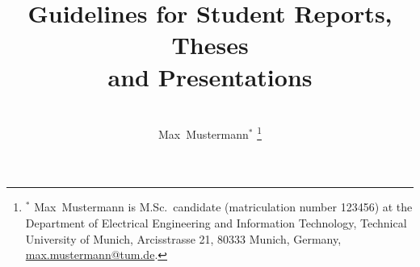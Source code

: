 \documentclass[journal]{IEEEtran}
\begin{document}
\title{Guidelines for Student Reports, Theses\\ and Presentations}

\author{%
\\
Max~Mustermann$^*$%
\thanks{$^*$ Max~Mustermann is M.Sc.\ candidate (matriculation number 123456) at the Department of Electrical Engineering and Information Technology, Technical University of Munich, Arcisstrasse 21, 80333 Munich, Germany, \url{max.mustermann@tum.de}.}
%
}%


\end{document}
